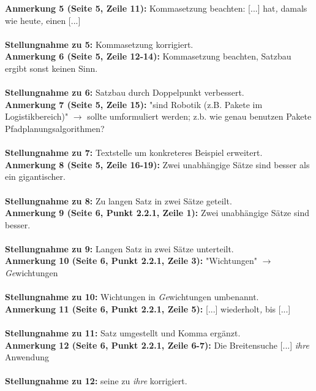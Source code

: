 \documentclass[a4paper,12pt]{book}
\begin{document}
\noindent
\textbf{Anmerkung 5 (Seite 5, Zeile 11):}
Kommasetzung beachten: [...] hat\emph{,} damals wie heute\emph{,} einen [...] \\
\\
\textbf{Stellungnahme zu 5:}
Kommasetzung korrigiert.\\

\noindent
\textbf{Anmerkung 6 (Seite 5, Zeile 12-14):}
Kommasetzung beachten, Satzbau ergibt sonst keinen Sinn. \\
\\
\textbf{Stellungnahme zu 6:}
Satzbau durch Doppelpunkt verbessert.
\\

\noindent
\textbf{Anmerkung 7 (Seite 5, Zeile 15):}
"sind Robotik (z.B. Pakete im Logistikbereich)" $\rightarrow$ sollte umformuliert werden; z.b. wie genau benutzen Pakete Pfadplanungsalgorithmen? \\
\\
\textbf{Stellungnahme zu 7:}
Textstelle um konkreteres Beispiel erweitert.
\\

\noindent
\textbf{Anmerkung 8 (Seite 5, Zeile 16-19):}
Zwei unabhängige Sätze sind besser als ein gigantischer. \\
\\
\textbf{Stellungnahme zu 8:}
Zu langen Satz in zwei Sätze geteilt.
\\

\noindent
\textbf{Anmerkung 9 (Seite 6, Punkt 2.2.1, Zeile 1):}
Zwei unabhängige Sätze sind besser. \\
\\
\textbf{Stellungnahme zu 9:}
Langen Satz in zwei Sätze unterteilt.
\\

\noindent
\textbf{Anmerkung 10 (Seite 6, Punkt 2.2.1, Zeile 3):}
"Wichtungen" $\rightarrow$ \emph{Ge}wichtungen \\
\\
\textbf{Stellungnahme zu 10:}
Wichtungen in \emph{Ge}wichtungen umbenannt.
\\

\noindent
\textbf{Anmerkung 11 (Seite 6, Punkt 2.2.1, Zeile 5):}
[...] wiederholt\emph{,} bis [...] \\
\\
\textbf{Stellungnahme zu 11:}
Satz umgestellt und Komma ergänzt.
\\

\noindent
\textbf{Anmerkung 12 (Seite 6, Punkt 2.2.1, Zeile 6-7):}
Die Breitensuche [...] \emph{ihre} Anwendung \\
\\
\textbf{Stellungnahme zu 12:}
\glqq seine \grqq zu \emph{ihre} korrigiert.
\\
\end{document}
